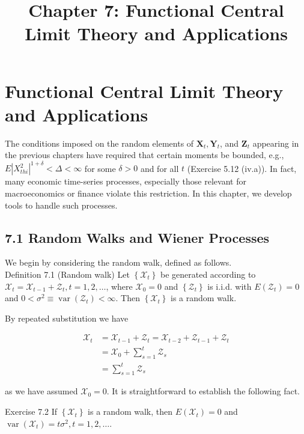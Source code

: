 \documentclass[10pt]{article}
\title{Chapter 7: Functional Central Limit Theory and Applications}
\author{}
\date{}
\begin{document}
\maketitle

\section*{Functional Central Limit Theory and Applications}
The conditions imposed on the random elements of $\mathbf{X}_{t}, \mathbf{Y}_{t}$, and $\mathbf{Z}_{t}$ appearing in the previous chapters have required that certain moments be bounded, e.g., $E\left|X_{t h i}^{2}\right|^{1+\delta}<\Delta<\infty$ for some $\delta>0$ and for all $t$ (Exercise 5.12 (iv.a)). In fact, many economic time-series processes, especially those relevant for macroeconomics or finance violate this restriction. In this chapter, we develop tools to handle such processes.

\subsection*{7.1 Random Walks and Wiener Processes}
We begin by considering the random walk, defined as follows.\\
Definition 7.1 (Random walk) Let $\left\{\mathcal{X}_{t}\right\}$ be generated according to $\mathcal{X}_{t}= \mathcal{X}_{t-1}+\mathcal{Z}_{t}, t=1,2, \ldots$, where $\mathcal{X}_{0}=0$ and $\left\{\mathcal{Z}_{t}\right\}$ is i.i.d. with $E\left(\mathcal{Z}_{t}\right)=0$ and $0<\sigma^{2} \equiv \operatorname{var}\left(\mathcal{Z}_{t}\right)<\infty$. Then $\left\{\mathcal{X}_{t}\right\}$ is a random walk.

By repeated substitution we have

$$
\begin{aligned}
\mathcal{X}_{t} & =\mathcal{X}_{t-1}+\mathcal{Z}_{t}=\mathcal{X}_{t-2}+\mathcal{Z}_{t-1}+\mathcal{Z}_{t} \\
& =\mathcal{X}_{0}+\sum_{s=1}^{t} \mathcal{Z}_{s} \\
& =\sum_{s=1}^{t} \mathcal{Z}_{s}
\end{aligned}
$$

as we have assumed $\mathcal{X}_{0}=0$. It is straightforward to establish the following fact.

Exercise 7.2 If $\left\{\mathcal{X}_{t}\right\}$ is a random walk, then $E\left(\mathcal{X}_{t}\right)=0$ and $\operatorname{var}\left(\mathcal{X}_{t}\right)= t \sigma^{2}, t=1,2, \ldots$.
\end{document}
